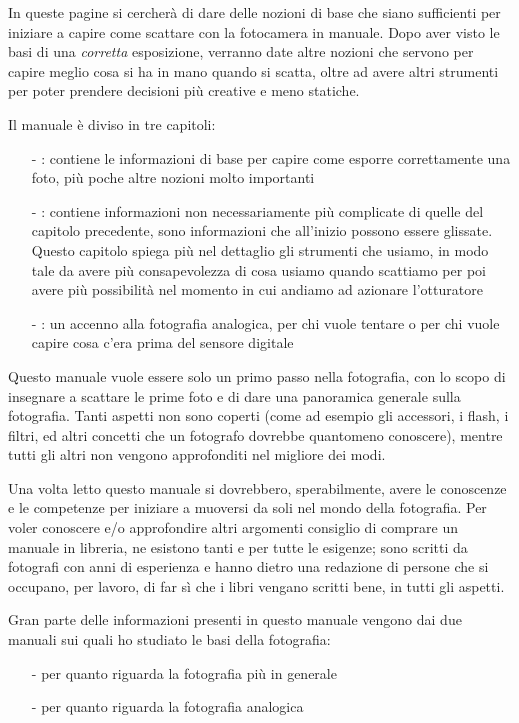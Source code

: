 In queste pagine si cercherà di dare delle nozioni di base che siano sufficienti per iniziare a capire come scattare con la fotocamera in manuale.
Dopo aver visto le basi di una \textit{corretta} esposizione, verranno date altre nozioni che servono per capire meglio cosa si ha in mano quando si scatta, oltre ad avere altri strumenti per poter prendere decisioni più creative e meno statiche.

Il manuale è diviso in tre capitoli:
\begin{itemize}
    \item[-] \textbf{}: contiene le informazioni di base per capire come esporre correttamente una foto, più poche altre nozioni molto importanti
    \item[-] \textbf{}: contiene informazioni non necessariamente più complicate di quelle del capitolo precedente, sono informazioni che all'inizio possono essere glissate. Questo capitolo spiega più nel dettaglio gli strumenti che usiamo, in modo tale da avere più consapevolezza di cosa usiamo quando scattiamo per poi avere più possibilità nel momento in cui andiamo ad azionare l'otturatore
    \item[-] \textbf{}: un accenno alla fotografia analogica, per chi vuole tentare o per chi vuole capire cosa c'era prima del sensore digitale
\end{itemize}

Questo manuale vuole essere solo un primo passo nella fotografia, con lo scopo di insegnare a scattare le prime foto e di dare una panoramica generale sulla fotografia.
Tanti aspetti non sono coperti (come ad esempio gli accessori, i flash, i filtri, ed altri concetti che un fotografo dovrebbe quantomeno conoscere), mentre tutti gli altri non vengono approfonditi nel migliore dei modi.

Una volta letto questo manuale si dovrebbero, sperabilmente, avere le conoscenze e le competenze per iniziare a muoversi da soli nel mondo della fotografia.
Per voler conoscere e/o approfondire altri argomenti consiglio di comprare un manuale in libreria, ne esistono tanti e per tutte le esigenze; sono scritti da fotografi con anni di esperienza e hanno dietro una redazione di persone che si occupano, per lavoro, di far sì che i libri vengano scritti bene, in tutti gli aspetti.

Gran parte delle informazioni presenti in questo manuale vengono dai due manuali sui quali ho studiato le basi della fotografia:
\begin{itemize}
    \item[-] \cite{gatcum2017manuale} per quanto riguarda la fotografia più in generale
    \item[-] \cite{marquardt2020fotografia} per quanto riguarda la fotografia analogica
\end{itemize}

